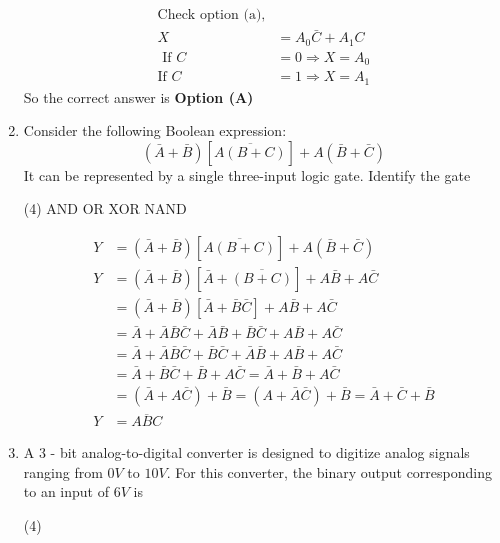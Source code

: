 \begin{enumerate}
\begin{tasks}
\begin{figure}[H]
		\end{figure}
	\end{tasks}
	\begin{answer}
		\begin{align*}
		\text{Check option (a),}\\
		X&=A_{0} \bar{C}+A_{1} C\\
		\text{	If }C&=0 \Rightarrow X=A_{0}\\
		\text{If }C&=1 \Rightarrow X=A_{1}
		\end{align*}
		So the correct answer is \textbf{Option (A)}
	\end{answer}
	\item Consider the following Boolean expression:
	$$
	(\bar{A}+\bar{B})[\overline{A(B+C)}]+A(\bar{B}+\bar{C})
	$$
	It can be represented by a single three-input logic gate. Identify the gate
	{}
	\begin{tasks}(4)
		\task[\textbf{A.}]  AND
		\task[\textbf{B.}] OR
		\task[\textbf{C.}] XOR
		\task[\textbf{D.}] NAND
	\end{tasks}
	\begin{answer}
		\begin{align*}
		Y&=(\bar{A}+\bar{B})[\overline{A(B+C)}]+A(\bar{B}+\bar{C})\\
		Y&=(\bar{A}+\bar{B})[\bar{A}+\overline{(B+C)}]+A \bar{B}+A \bar{C}\\
		&=(\bar{A}+\bar{B})[\bar{A}+\bar{B} \bar{C}]+A \bar{B}+A \bar{C}\\
		&=\bar{A}+\bar{A} \bar{B} \bar{C}+\bar{A} \bar{B}+\bar{B} \bar{C}+A \bar{B}+A \bar{C}\\
		&=\bar{A}+\bar{A} \bar{B} \bar{C}+\bar{B} \bar{C}+\bar{A} \bar{B}+A \bar{B}+A \bar{C}\\
		&=\bar{A}+\bar{B} \bar{C}+\bar{B}+A \bar{C}=\bar{A}+\bar{B}+A \bar{C}\\
		&=(\bar{A}+A \bar{C})+\bar{B}=(A+\bar{A} \bar{C})+\bar{B}=\bar{A}+\bar{C}+\bar{B}\\
		Y&=\overline{A B C}
		\end{align*}
	\end{answer}
	\item A 3 - bit analog-to-digital converter is designed to digitize analog signals ranging from $0 V$ to $10 V$. For this converter, the binary output corresponding to an input of $6 V$ is
	{	}
	\begin{tasks}(4)
	\end{tasks}

\end{enumerate}
